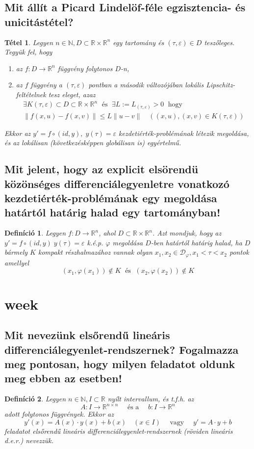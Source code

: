 \documentclass[12pt,a4paper]{article}
\newcommand{\norm}[1]{\lVert #1 \rVert}
\newcommand{\R}{\mathbb{R}}
\newcommand{\N}{\mathbb{N}}
\newcommand{\CD}{\mathcal{D}}
\newcommand{\f}{\varphi}
\newcommand{\bb}[1]{\left( #1 \right)}
\newtheorem{tet}{Tétel}[section]
\newtheorem{defi}{Definíció}[section]
\begin{document}
\subsection{Mit állít a Picard Lindelöf-féle egzisztencia- és unicitástétel?}
\begin{tet}
Legyen $n \in \N, D \subset \R \times \R^n$ egy tartomány és $(\tau,\varepsilon) \in D$ teszőleges. Tegyük fel, hogy
\begin{enumerate}
\item az $f: D \to \R^n$ függvény folytonos $D$-n,
\item az $f$ függvény a $(\tau,\varepsilon)$ pontban a második változójában lokális Lipschitz-feltételnek tesz eleget, azaz
\begin{align*}
\exists K (\tau,\varepsilon) \subset D \subset \R \times \R^n \; \text{ és } \; \exists L:=L_{(\tau,\varepsilon)} > 0 \; \text{ hogy} \\
\norm{f(x,u)-f(x,v)} \leq L\norm{u-v} \quad \bb{(x,u),(x,v) \in K(\tau,\varepsilon)} 
\end{align*}
\end{enumerate} 
Ekkor az $y' = f \circ (id,y),\; y(\tau)= \varepsilon$ kezdetiérték-problémának létezik megoldása, és az lokálisan (következésképpen globálisan is) egyértelmű. 
\end{tet}
\subsection{Mit jelent, hogy az explicit elsörendü közönséges differenciálegyenletre vonatkozó kezdetiérték-problémának egy megoldása határtól határig halad egy tartományban!}
\begin{defi}
Legyen $f: D \to \R^n$, ahol $D \subset \R \times \R^n$. Azt mondjuk, hogy az $y' = f \circ (id,y) \; y(\tau)= \varepsilon$ k.é.p. $\f$ megoldása $D$-ben határtól határig halad, ha $D$ bármely $K$ kompakt részhalmazához vannak olyan $x_1,x_2 \in \CD_\f, x_1 < \tau < x_2$ pontok amellyel
\[
\bb{x_1,\f(x_1)} \notin K \; \text{ és } \;  \bb{x_2,\f(x_2)} \notin K
\]
\end{defi}
\newpage
\section{week}
\subsection{Mit nevezünk elsőrendű lineáris differenciálegyenlet-rendszernek? Fogalmazza meg pontosan, hogy milyen feladatot oldunk meg ebben az esetben!}
\begin{defi}
Legyen $n \in \N, I \subset \R $ nyílt intervallum, és t.f.h. az
\[
A : I \to \R^{n \times n} \quad \text{ és a } \quad b: I \to \R^n
\]
adott folytonos függvények. Ekkor az
\[
y'(x) = A(x) \cdot y(x) + b(x) \quad \bb{x \in I} \quad \text{ vagy } \quad y' = A \cdot y + b
\]
feladatot elsőrendű lineáris differenciálegyenlet-rendszernek (röviden lineáris d.e.r.) nevezzük.
\end{defi}
\end{document}
